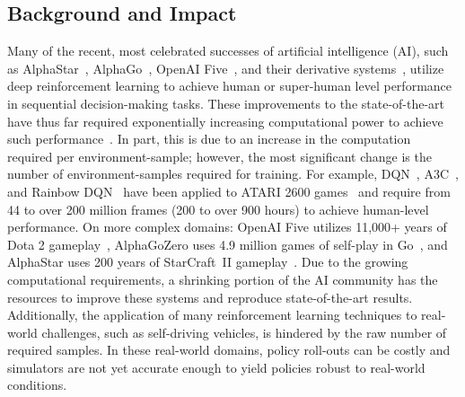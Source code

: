 \subsection{Background and Impact}


Many of the recent, most celebrated successes of artificial intelligence (AI), such as AlphaStar~\cite{starcraft2019}, AlphaGo~\cite{silver2017mastering}, OpenAI Five~\cite{berner2019dota}, and their derivative systems~\cite{alphazero}, utilize deep reinforcement learning to achieve human or super-human level performance in sequential decision-making tasks.
    These improvements to the state-of-the-art have thus far required exponentially increasing computational power to achieve such performance~\cite{amodei_hednandez_2018}.
        In part, this is due to an increase in the computation required per environment-sample; however, the most significant change is the number of environment-samples required for training. 
            For example, DQN~\cite{mnih2015human}, A3C~\cite{mnih2016asynchronous}, and Rainbow DQN~\cite{hessel2018rainbow} have been applied to ATARI 2600 games~\cite{bellemare2013arcade} and require from 44 to over 200 million frames (200 to over 900 hours) to achieve human-level performance. 
            On more complex domains: OpenAI Five utilizes 11,000+ years of Dota 2 gameplay~\cite{openai_2018}, AlphaGoZero uses 4.9 million games of self-play in Go~\cite{silver2017mastering}, and AlphaStar uses 200 years of StarCraft~II gameplay~\cite{deepmind}. 
    Due to the growing computational requirements, a shrinking portion of the AI community has the resources to improve these systems and reproduce state-of-the-art results. 
        Additionally, the application of many reinforcement learning techniques to real-world challenges, such as self-driving vehicles, is hindered by the raw number of required samples.
        In these real-world domains, policy roll-outs can be costly and simulators are not yet accurate enough to yield policies robust to real-world conditions.

